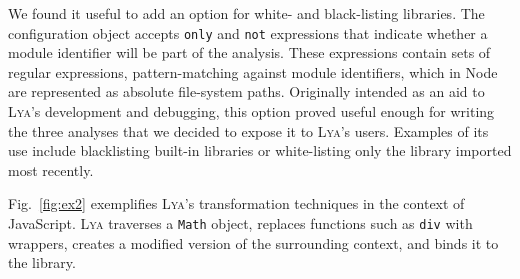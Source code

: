 \documentclass[letterpaper,twocolumn,10pt]{article}
\def\eg{{\em e.g.}, }
\newcommand{\ttt}[1]{\texttt{#1}}
\newcommand{\sys}{{\scshape Lya}\xspace}
\begin{document}




We found it useful to add an option for white- and black-listing libraries.
The configuration object accepts \ttt{only} and \ttt{not} expressions that indicate whether a module identifier will be part of the analysis.
These expressions contain sets of regular expressions, pattern-matching against module identifiers, which in Node are represented as absolute file-system paths.
Originally intended as an aid to \sys's development and debugging, this option proved useful enough for writing the three analyses that we decided to expose it to \sys's users.
Examples of its use include blacklisting built-in libraries or white-listing only the library imported most recently.



Fig.~\ref{fig:ex2} exemplifies \sys's transformation techniques in the context of JavaScript.
\sys traverses a \ttt{Math} object, replaces functions such as \ttt{div} with wrappers, creates a modified version of the surrounding context, and binds it to the library.
\end{document}
